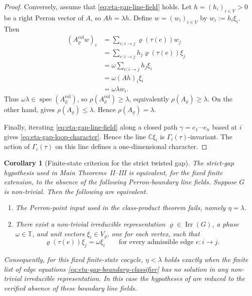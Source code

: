 \documentclass[11pt,a4paper]{amsart}
\theoremstyle{plain}
\newtheorem{corollary}[theorem]{Corollary}
\theoremstyle{definition}
\theoremstyle{remark}
\DeclareMathOperator{\spec}{spec}
\DeclareMathOperator{\Irr}{Irr}
\newcommand{\CC}{\mathbb{C}}
\newcommand{\TT}{\mathbb{T}}
\begin{document}
\begin{proof}
  Conversely, assume that \eqref{eq:eta-gap-line-field} holds. Let
  \(h=(h_i)_{i\in V}>0\) be a right Perron vector of \(A\), so
  \(Ah=\lambda h\). Define \(w=(w_i)_{i\in V}\) by
  \(w_i:=h_i\xi_i\). Then
  \begin{align*}
    (A_\varrho^{\mathrm{col}} w)_i
    &=
    \sum_{e:i\to j}\varrho(\tau(e))w_j \\
    &=
    \sum_{e:i\to j}h_j\varrho(\tau(e))\xi_j \\
    &=
    \omega\sum_{e:i\to j}h_j\xi_i \\
    &=
    \omega(Ah)_i\xi_i \\
    &=
    \omega\lambda w_i.
  \end{align*}
  Thus \(\omega\lambda\in\spec(A_\varrho^{\mathrm{col}})\), so
  \(\rho(A_\varrho^{\mathrm{col}})\ge \lambda\), equivalently
  \(\rho(A_\varrho)\ge \lambda\). On the other hand,
   gives
  \(\rho(A_\varrho)\le \lambda\). Hence
  \(\rho(A_\varrho)=\lambda\).

  Finally, iterating \eqref{eq:eta-gap-line-field} along a closed path
  \(\gamma=e_1\cdots e_n\) based at \(i\) gives
  \eqref{eq:eta-gap-loop-character}. Hence the line \(\CC\xi_i\) is
  \(\Gamma_i(\tau)\)-invariant. The action of \(\Gamma_i(\tau)\) on
  this line defines a one-dimensional character.
\end{proof}

\begin{corollary}[Finite-state criterion for the strict twisted gap]
  \label{cor:eta-gap-boundary-classifier}
  The strict-gap hypothesis used in Main Theorems~II--III is equivalent, for
  the fixed finite extension, to the absence of the following Perron-boundary
  line fields.
  Suppose \(G\) is non-trivial. Then the following are equivalent.
  \begin{enumerate}
    \item The Perron-point input used in the class-product theorem fails,
      namely \(\eta=\lambda\).
    \item There exist a non-trivial irreducible representation
      \(\varrho\in\Irr(G)\), a phase \(\omega\in\TT\), and unit vectors
      \(\xi_i\in V_\varrho\), one for each vertex, such that
      \begin{equation}\label{eq:eta-gap-boundary-classifier}
        \varrho(\tau(e))\xi_j=\omega\xi_i
        \qquad
        \text{for every admissible edge } e:i\to j.
      \end{equation}
  \end{enumerate}
  Consequently, for this fixed finite-state cocycle, \(\eta<\lambda\) holds
  exactly when the finite list of edge equations
  \eqref{eq:eta-gap-boundary-classifier} has no solution in any non-trivial
  irreducible representation. In this case the hypotheses of
   are reduced to the verified absence
  of these boundary line fields.
\end{corollary}
\end{document}
